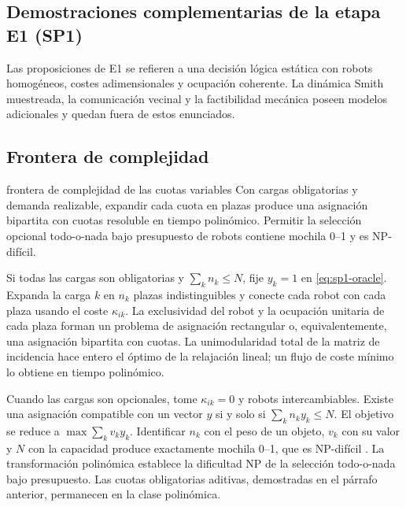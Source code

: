 \subsection{Demostraciones complementarias de la etapa E1 (SP1)}
\label{app:sp1-proofs}

Las proposiciones de E1 se refieren a una decisión lógica estática con robots homogéneos, costes adimensionales y ocupación coherente. La dinámica Smith muestreada, la comunicación vecinal y la factibilidad mecánica poseen modelos adicionales y quedan fuera de estos enunciados.

\subsection{Frontera de complejidad}
\label{app:sp1-complexity}

\begin{contribucion}{frontera de complejidad de las cuotas variables}
Con cargas obligatorias y demanda realizable, expandir cada cuota en plazas produce una asignación bipartita con cuotas resoluble en tiempo polinómico. Permitir la selección opcional todo-o-nada bajo presupuesto de robots contiene mochila 0--1 y es NP-difícil.
\end{contribucion}

Si todas las cargas son obligatorias y $\sum_kn_k\leq N$, fije $y_k=1$ en \eqref{eq:sp1-oracle}. Expanda la carga $k$ en $n_k$ plazas indistinguibles y conecte cada robot con cada plaza usando el coste $\kappa_{ik}$. La exclusividad del robot y la ocupación unitaria de cada plaza forman un problema de asignación rectangular o, equivalentemente, una asignación bipartita con cuotas. La unimodularidad total de la matriz de incidencia hace entero el óptimo de la relajación lineal; un flujo de coste mínimo lo obtiene en tiempo polinómico.

Cuando las cargas son opcionales, tome $\kappa_{ik}=0$ y robots intercambiables. Existe una asignación compatible con un vector $y$ si y solo si $\sum_kn_ky_k\leq N$. El objetivo se reduce a $\max\sum_kv_ky_k$. Identificar $n_k$ con el peso de un objeto, $v_k$ con su valor y $N$ con la capacidad produce exactamente mochila 0--1, que es NP-difícil \parencite{karp1972reducibility}. La transformación polinómica establece la dificultad NP de la selección todo-o-nada bajo presupuesto. Las cuotas obligatorias aditivas, demostradas en el párrafo anterior, permanecen en la clase polinómica.

